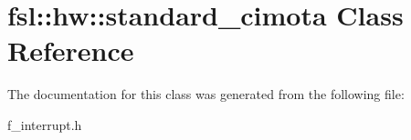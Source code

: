 \hypertarget{classfsl_1_1hw_1_1standard__cimota}{}\section{fsl\+::hw\+::standard\+\_\+cimota Class Reference}
\label{classfsl_1_1hw_1_1standard__cimota}


The documentation for this class was generated from the following file\+:\begin{DoxyCompactItemize}
\item 
f\+\_\+interrupt.\+h\end{DoxyCompactItemize}
